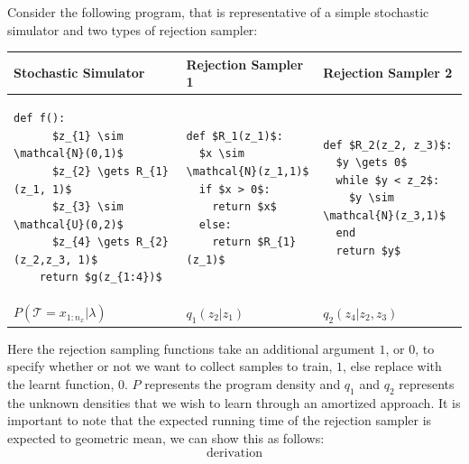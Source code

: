 \documentclass{article}
\begin{document}
Consider the following program, that is representative of a simple stochastic simulator
and two types of rejection sampler:


\noindent
\begin{tabular}{|p{3.6cm}|p{3.6cm}|p{3.6cm}|}
\hline
Stochastic Simulator  & Rejection Sampler 1 & Rejection Sampler 2 \\
\hline
\begin{lstlisting}[mathescape=true]
    def f():
      $z_{1} \sim \mathcal{N}(0,1)$
      $z_{2} \gets R_{1}(z_1, 1)$
      $z_{3} \sim \mathcal{U}(0,2)$
      $z_{4} \gets R_{2}(z_2,z_3, 1)$
    return $g(z_{1:4})$
\end{lstlisting}&
\begin{lstlisting}[mathescape=true]
def $R_1(z_1)$:
  $x \sim \mathcal{N}(z_1,1)$
  if $x > 0$:
    return $x$
  else:
    return $R_{1}(z_1)$
\end{lstlisting}&
\begin{lstlisting}[mathescape=true]
def $R_2(z_2, z_3)$:
  $y \gets 0$
  while $y < z_2$:
    $y \sim \mathcal{N}(z_3,1)$
  end
  return $y$
\end{lstlisting}\\
\hline
$P(\mathcal{T}= x_{1:n_x} | \lambda)$ & $q_{1}(z_{2} | z_{1})$ & $q_{2}(z_{4} |z_{2},z_{3})$ \\
\hline
\end{tabular} 

Here the rejection sampling functions take an additional argument $1$, or $0$,
to specify whether or not we want to collect samples to train, $1$, else replace with 
the learnt function, $0$. $P$ represents the program density and $q_{1}$ and $q_{2}$ represents 
the unknown densities that we wish to learn through an amortized approach.
It is important to note that the expected running time of the rejection sampler is expected to geometric mean, we can show this as follows:
\begin{equation}
\text{derivation}
\end{equation}
\end{document}
